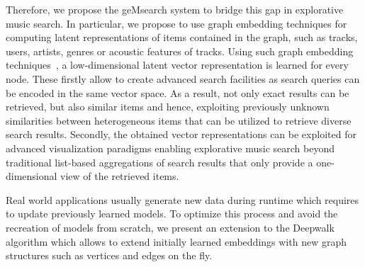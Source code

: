 \documentclass[sigconf]{acmart}
\begin{document}
Therefore, we propose the geMsearch system to bridge this gap in explorative music search. In particular, we propose to use graph embedding techniques for computing latent representations of items contained in the graph, such as tracks, users, artists, genres or acoustic features of tracks. Using such graph embedding techniques~\cite{yan2007graph}, a low-dimensional latent vector representation is learned for every node. These firstly allow to create advanced search facilities as search queries can be encoded in the same vector space. As a result, not only exact results can be retrieved, but also similar items and hence, exploiting previously unknown similarities between heterogeneous items that can be utilized to retrieve diverse search results. Secondly, the obtained vector representations can be exploited for advanced visualization paradigms enabling explorative music search beyond traditional list-based aggregations of search results that only provide a one-dimensional view of the retrieved items. 

Real world applications usually generate new data during runtime which requires to update previously learned models. To optimize this process and avoid the recreation of models from scratch, we present an extension to the Deepwalk algorithm which allows to extend initially learned embeddings with new graph structures such as vertices and edges on the fly.




\end{document}
